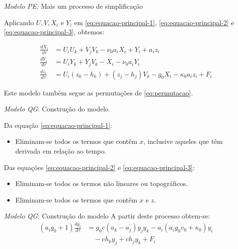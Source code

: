 
\begin{frame}{\textit{Modelo PE:} Mais um processo de simplificação}

Aplicando $U, V, X_i$ e $Y_i$ em \eqref{eq:equacao-principal-1}, \eqref{eq:equacao-principal-2} e \eqref{eq:equacao-principal-3}, obtemos:

\begin{align}
    \frac{dX_i}{d\tau} &= U_iU_k + V_jV_k - \nu_0a_iX_i + Y_i + a_iz_i \label{eq:equacao-principal-simplificada-1}\\
    \frac{dY_i}{d\tau} &= U_iY_k + Y_jV_k - X_i - \nu_0a_iY_i \label{eq:equacao-principal-simplificada-2}\\
    \frac{dz_i}{d\tau} &= U_i(z_k - h_k) + (z_j - h_j)V_k - g_0X_i - \kappa_0a_iz_i + F_i \label{eq:equacao-principal-simplificada-3}
\end{align}

Este modelo também segue as permutações de \eqref{eq:permutacao}.

\end{frame}


\begin{frame}{\textit{Modelo QG}: Construção do modelo}



Da equação \eqref{eq:equacao-principal-1}:
\begin{itemize}
    \item Eliminam-se todos os termos que contêm $x$, inclusive aqueles que têm derivada em relação ao tempo.
\end{itemize}

Das equações \eqref{eq:equacao-principal-2} e \eqref{eq:equacao-principal-3}:
\begin{itemize}
    \item Eliminam-se todos os termos não lineares ou topográficos. 
    \item Eliminam-se todos os termos que contêm $x$ e $z$.
\end{itemize}

\end{frame}



\begin{frame}{\textit{Modelo QG}: Construção do modelo}
A partir deste processo obtem-se:
\begin{align}
    (a_ig_0 + 1)\frac{dy_i}{d\tau} &= g_0c(a_k - a_j)y_jy_k - a_i(a_ig_0v_0 + \kappa_0)y_i\nonumber \\ 
    &\quad - ch_ky_j + ch_jy_k + F_i \label{eq:qg-model}
\end{align}

\end{frame}

